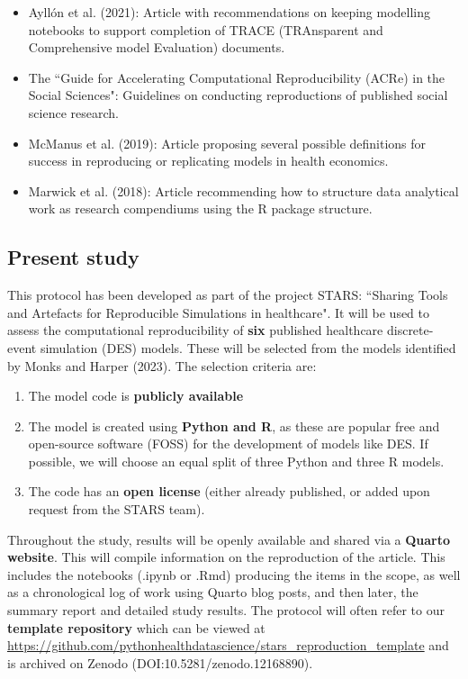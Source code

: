 \begin{itemize}
    \item Ayllón et al. (2021):\autocite{ayllon_keeping_2021} Article with recommendations on keeping modelling notebooks to support completion of TRACE (TRAnsparent and Comprehensive model Evaluation) documents.
    \item The ``Guide for Accelerating Computational Reproducibility (ACRe) in the Social Sciences":\autocite{berkeley_initiative_for_transparency_in_the_social_sciences_guide_2022} Guidelines on conducting reproductions of published social science research.
    \item McManus et al. (2019):\autocite{mcmanus_can_2019} Article proposing several possible definitions for success in reproducing or replicating models in health economics.
    \item Marwick et al. (2018):\autocite{marwick_packaging_2018} Article recommending how to structure data analytical work as research compendiums using the R package structure.
\end{itemize}

\vspace{0.5cm}
\subsection{Present study}

This protocol has been developed as part of the project STARS: ``Sharing Tools and Artefacts for Reproducible Simulations in healthcare". It will be used to assess the computational reproducibility of \textbf{six} published healthcare discrete-event simulation (DES) models. These will be selected from the models identified by Monks and Harper (2023).\autocite{monks_computer_2023} The selection criteria are:

\begin{enumerate}
    \item The model code is \textbf{publicly available}
    \item The model is created using \textbf{Python and R}, as these are popular free and open-source software (FOSS) for the development of models like DES.\autocite{monks_computer_2023} If possible, we will choose an equal split of three Python and three R models.
    \item The code has an \textbf{open license} (either already published, or added upon request from the STARS team).
\end{enumerate}

Throughout the study, results will be openly available and shared via a \textbf{Quarto website}\autocite{allaire_quarto_2024}. This will compile information on the reproduction of the article. This includes the notebooks (.ipynb or .Rmd) producing the items in the scope, as well as a chronological log of work using Quarto blog posts, and then later, the summary report and detailed study results. The protocol will often refer to our \textbf{template repository} which can be viewed at \url{https://github.com/pythonhealthdatascience/stars_reproduction_template} and is archived on Zenodo (DOI:10.5281/zenodo.12168890).\autocite{heather_template_2024}

